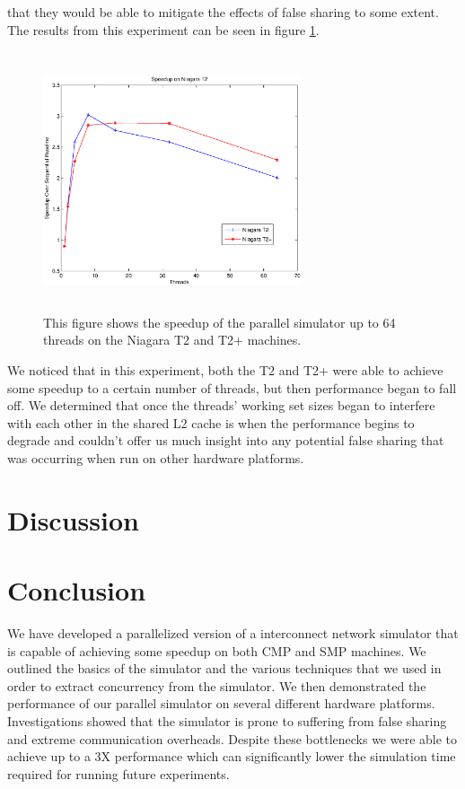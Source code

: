 \documentclass[twocolumn]{article}
\begin{document}
that they would be able to mitigate the effects of false sharing to some
extent.  The results from this experiment can be seen in figure
\ref{niagara}.
\begin{figure}[h]
\centering
\includegraphics[height=3in,width=3in]{niagara.eps}
\caption{\label{niagara}This figure shows the speedup of the parallel simulator
up to 64 threads on the Niagara T2 and T2+ machines.}
\end{figure}
We noticed that in this experiment, both the T2 and T2+ were able to
achieve some speedup to a certain number of threads, but then performance
began to fall off.  We determined that once the threads' working set sizes
began to interfere with each other in the shared L2 cache is when the
performance begins to degrade and couldn't offer us much insight into  any potential false sharing that was occurring when run on other
hardware platforms.

\section{Discussion \label{disc}}


\section{Conclusion \label{conc}}
We have developed a parallelized version of a interconnect network
simulator that is capable of achieving some speedup on both CMP and SMP
machines.  We outlined the basics of the simulator and the various
techniques that we used in order to extract concurrency from the
simulator.  We then demonstrated the performance of our parallel simulator
on several different hardware platforms.  Investigations showed that the
simulator is prone to suffering from false sharing and extreme
communication overheads.  Despite these bottlenecks we were able to
achieve up to a 3X performance which can significantly lower the
simulation time required for running future experiments.







\end{document}
